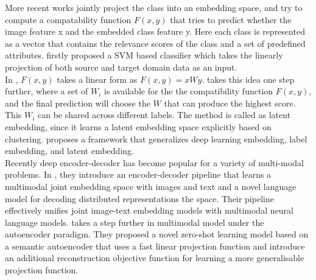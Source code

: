 \documentclass{article}
\newcommand{\bb}[1]{\boldsymbol{#1}}
\begin{document}
	More recent works jointly project the class into an embedding space, and try to compute a compatability function $F(x, y)$ that tries to predict whether the image feature x and the embedded class feature y. Here each class is represented as a vector that contains the relevance scores of the class and a set of predefined attributes. \cite{hariharan2012efficient} firstly proposed a SVM based classifier which takes the linearly projection of both source and target domain data as an input. \\ 
    
    In \cite{akata2013label}, $F(x, y)$ takes a linear form as $F(x, y) = xWy$. \cite{xian2016latent} takes this idea one step further, where a set of $W_i$ is available for the the compatibility function $F(x, y)$, and the final prediction will choose the $W$ that can produce the highest score. This $W_i$ can be shared across different labels.  The method is called as latent embedding, since it learns a latent embedding space explicitly based on clustering. \cite{zhang2015zero, zhang2016zero} proposes a framework that generalizes deep learning embedding, label embedding, and latent embedding. \\ 
    
    Recently deep encoder-decoder has become popular for a variety of multi-modal problems. In \cite{kiros2014unifying}, they introduce an encoder-decoder pipeline that learns a multimodal joint embedding space with images and text and a novel language model for decoding distributed representations the space. Their pipeline effectively unifies joint image-text embedding models with multimodal neural language models. \cite{kodirov2017semantic} takes a step further in multimodal model under the autoencoder paradigm. They proposed a novel zero-shot learning model based on a semantic autoencoder that uses a fast linear projection function and introduce an additional reconstruction objective function for learning a more generalisable projection function. \\ 


	
\end{document}
